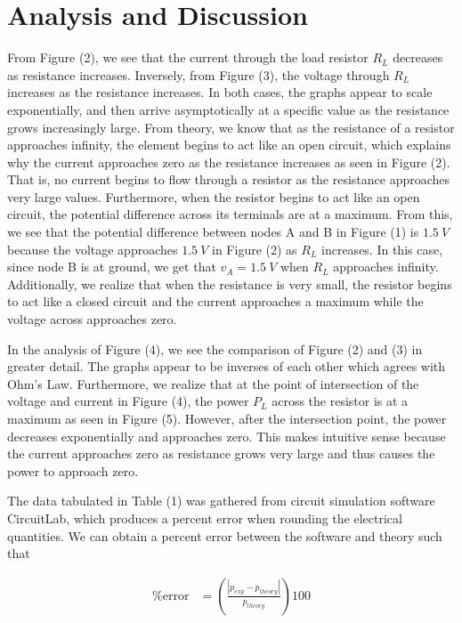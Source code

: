 \documentclass[12pt]{article}
\begin{document}
\section{Analysis and Discussion}
From Figure (2), we see that the current through the load resistor $R_L$ decreases as resistance increases. Inversely, from Figure (3), the voltage through $R_L$ increases as the resistance increases. In both cases, the graphs appear to scale exponentially, and then arrive asymptotically at a specific value as the resistance grows increasingly large. From theory, we know that as the resistance of a resistor approaches infinity, the element begins to act like an open circuit, which explains why the current approaches zero as the resistance increases as seen in Figure (2). That is, no current begins to flow through a resistor as the resistance approaches very large values. Furthermore, when the resistor begins to act like an open circuit, the potential difference across its terminals are at a maximum. From this, we see that the potential difference between nodes A and B in Figure (1) is $\SI{1.5}{V}$ because the voltage approaches $\SI{1.5}{V}$ in Figure (2) as $R_L$ increases. In this case, since node B is at ground, we get that $v_A = \SI{1.5}{V}$ when $R_L$ approaches infinity. Additionally, we realize that when the resistance is very small, the resistor begins to act like a closed circuit and the current approaches a maximum while the voltage across approaches zero.

In the analysis of Figure (4), we see the comparison of Figure (2) and (3) in greater detail. The graphs appear to be inverses of each other which agrees with Ohm's Law. Furthermore, we realize that at the point of intersection of the voltage and current in Figure (4), the power $P_L$ across the resistor is at a maximum as seen in Figure (5). However, after the intersection point, the power decreases exponentially and approaches zero. This makes intuitive sense because the current approaches zero as resistance grows very large and thus causes the power to approach zero.

The data tabulated in Table (1) was gathered from circuit simulation software CircuitLab, which produces a percent error when rounding the electrical quantities. We can obtain a percent error between the software and theory such that

\begin{equation}
    \begin{split}
        \text{\% error} &= \left( \frac{|p_{exp} - p_{theory}|}{p_{theory}} \right) 100 \\
    \end{split}
\end{equation}
\end{document}
